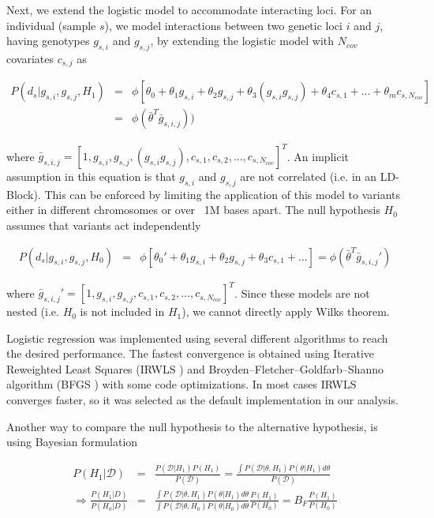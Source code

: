 Next, we extend the logistic model to accommodate interacting loci. For an individual (sample $s$), we model interactions between two genetic loci $i$ and $j$, having genotypes $g_{s,i}$ and $g_{s,j}$, by extending the logistic model with $N_{cov}$ covariates $c_{s,j}$ as

\begin{eqnarray*}
	P( d_s | g_{s,i},g_{s,j}, H_1) & = & \phi[ \theta_0 + \theta_1 g_{s,i} + \theta_2 g_{s,j} + \theta_3 (g_{s,i} g_{s,j}) + \theta_4 c_{s,1} + ... + \theta_m c_{s,N_{cov}} ] \\
	& = & \phi( \bar{\theta}^T \bar{g}_{s,i,j}) )
\end{eqnarray*}

where $\bar{g}_{s,i,j} =  [1, g_{s,i}, g_{s,j}, ( g_{s,i} g_{s,j}), c_{s,1}, c_{s,2}, ..., c_{s,N_{cov}} ]^T$. An implicit assumption in this equation is that $g_{s,i}$ and $g_{s,j}$ are not correlated (i.e. in an LD-Block). This can be enforced by limiting the application of this model to variants either in different chromosomes or over ~1M bases apart. The null hypothesis $H_0$ assumes that variants act independently

\begin{eqnarray*}
	P( d_s | g_{s,i},g_{s,j}, H_0) & = & 
	\phi[ \theta_0' + \theta_1 g_{s,i} + \theta_2 g_{s,j} + \theta_3 c_{s,1} + ... ] 
	= \phi( \bar{\theta}^T \bar{g}_{s,i,j}' )
\end{eqnarray*}

where $\bar{g}_{s,i,j}' =  [1, g_{s,i}, g_{s,j}, c_{s,1} , c_{s,2}, ..., c_{s,N_{cov}} ]^T$. Since these models are not nested (i.e. $H_0$ is not included in $H_1$), we cannot directly apply Wilks theorem.

Logistic regression was implemented using several different algorithms to reach the desired performance. The fastest convergence is obtained using Iterative Reweighted Least Squares (IRWLS \cite{daubechies2010iteratively}) and Broyden–Fletcher–Goldfarb–Shanno algorithm (BFGS \cite{broyden1970convergence}) with some code optimizations. In most cases IRWLS converges faster, so it was selected as the default implementation in our analysis.

Another way to compare the null hypothesis to the alternative hypothesis, is using Bayesian formulation \cite{kass1995bayes,wakefield2009bayes}

\begin{eqnarray*}
	P(H_1 | \mathcal{D}) & = & \frac{ P( \mathcal{D} | H_1) P(H_1) }{ P(\mathcal{D}) } = \frac{ \int{ P(\mathcal{D} | \theta , H_1) P( \theta | H_1)  d\theta } }{ P(\mathcal{D}) }  \\
	\Rightarrow  \frac{ P(H_1 | D)  }{ P(H_0 | D)  } & = & \frac{ \int{ P(\mathcal{D} | \theta , H_1) P( \theta | H_1)  d\theta } }{\int{ P(\mathcal{D} | \theta , H_0 ) P( \theta | H_0)  d\theta } } \frac{ P(H_1) }{ P(H_0)  }  
	=  B_F \frac{ P(H_1) }{ P(H_0)  }
\end{eqnarray*}

